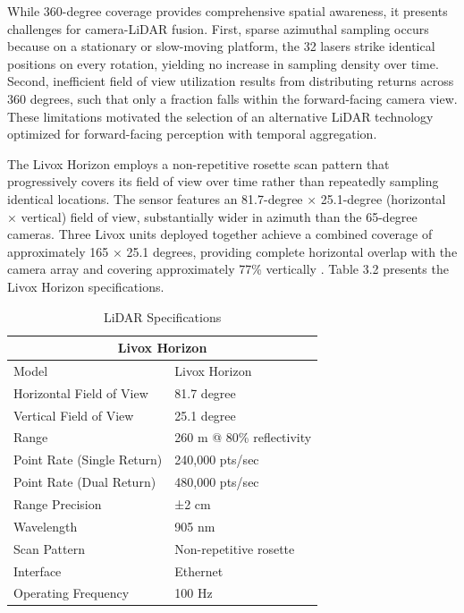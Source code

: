 \documentclass{erauthesis}
\begin{document}
While 360-degree coverage provides comprehensive spatial awareness, it presents challenges for camera-\ac{LiDAR} fusion.
First, sparse azimuthal sampling occurs because on a stationary or slow-moving platform, the 32 lasers strike identical positions on every rotation, yielding no increase in sampling density over time.
Second, inefficient field of view utilization results from distributing returns across 360 degrees, such that only a fraction falls within the forward-facing camera view.
These limitations motivated the selection of an alternative \ac{LiDAR} technology optimized for forward-facing perception with temporal aggregation.

The Livox Horizon employs a non-repetitive rosette scan pattern that progressively covers its field of view over time rather than repeatedly sampling identical locations.
The sensor features an 81.7-degree × 25.1-degree (horizontal × vertical) field of view, substantially wider in azimuth than the 65-degree cameras.
Three Livox units deployed together achieve a combined coverage of approximately 165 × 25.1 degrees, providing complete horizontal overlap with the camera array and covering approximately 77\% vertically \cite{thompson2023}.
Table 3.2 presents the Livox Horizon specifications.

\begin{table}[htpb]
\centering
\caption{LiDAR Specifications}
\begin{tabular}{ll}
\hline
\multicolumn{2}{c}{Livox Horizon}\\
\hline
\hline
Model & Livox Horizon \\
Horizontal Field of View & 81.7 degree \\
Vertical Field of View & 25.1 degree \\
Range & 260 m @ 80\% reflectivity \\
Point Rate (Single Return) & 240,000 pts/sec \\
Point Rate (Dual Return) & 480,000 pts/sec \\
Range Precision & ±2 cm \\
Wavelength & 905 nm \\
Scan Pattern & Non-repetitive rosette \\
Interface & Ethernet \\
Operating Frequency & 100 Hz \\
\hline
\end{tabular}
\label{tab:livox_horizon_specs}
\end{table}
\end{document}
